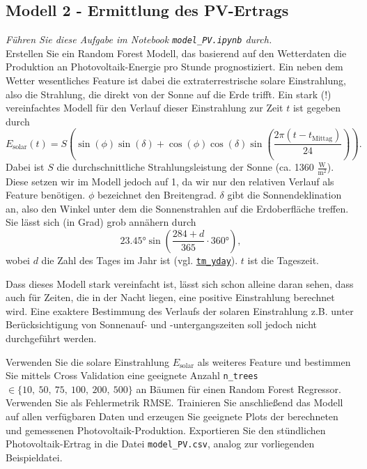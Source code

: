 \documentclass[11pt,a4paper]{article}
\begin{document}
\subsection*{Modell 2 - Ermittlung des PV-Ertrags}
\emph{Führen Sie diese Aufgabe im Notebook \texttt{model\_PV.ipynb} durch.}\\
Erstellen Sie ein Random Forest Modell, das basierend auf den Wetterdaten die Produktion an Photovoltaik-Energie pro Stunde prognostiziert. Ein neben dem Wetter wesentliches Feature ist dabei die extraterrestrische solare Einstrahlung, also die Strahlung, die direkt von der Sonne auf die Erde trifft. Ein stark (!) vereinfachtes Modell für den Verlauf dieser Einstrahlung zur Zeit $t$ ist gegeben durch 
$$ E_{\text{solar}}(t) = S \left( \sin(\phi)  \sin(\delta) + \cos(\phi) \cos(\delta)  \sin\left(\frac{2\pi(t - t_{\text{Mittag}})}{24}\right) \right).$$
Dabei ist $S$ die durchschnittliche Strahlungsleistung der Sonne (ca. 1360 $\frac{\text{W}}{\text{m}^2}$). Diese setzen wir im Modell jedoch auf 1, da wir nur den relativen Verlauf als Feature benötigen. $\phi$ bezeichnet den Breitengrad. $\delta$ gibt die Sonnendeklination an, also den Winkel unter dem die Sonnenstrahlen auf die Erdoberfläche treffen. Sie lässt sich (in Grad) grob annähern durch
$$ 23.45°  \sin\left(\frac{284 + d}{365} \cdot 360°  \right),$$
wobei $d$ die Zahl des Tages im Jahr ist (vgl. \href{https://docs.python.org/3/library/time.html#time.struct_time}{\texttt{tm\_yday}}).
$t$ ist die Tageszeit.

Dass dieses Modell stark vereinfacht ist, lässt sich schon alleine daran sehen, dass auch für Zeiten, die in der Nacht liegen, eine positive Einstrahlung berechnet wird. Eine exaktere Bestimmung des Verlaufs der solaren Einstrahlung z.B. unter Berücksichtigung von Sonnenauf- und -untergangszeiten soll jedoch nicht durchgeführt werden.

Verwenden Sie die solare Einstrahlung $E_\text{solar}$ als weiteres Feature und bestimmen Sie mittels Cross Validation eine geeignete Anzahl \texttt{n\_trees} $\in\lbrace 10,\ 50,\ 75,\ 100,\ 200,\ 500\rbrace$ an Bäumen für einen Random Forest Regressor. Verwenden Sie als Fehlermetrik RMSE. Trainieren Sie anschließend das Modell auf allen verfügbaren Daten und erzeugen Sie geeignete Plots der berechneten und gemessenen Photovoltaik-Produktion.  Exportieren Sie den stündlichen Photovoltaik-Ertrag in die Datei \texttt{model\_PV.csv}, analog zur vorliegenden Beispieldatei.
\end{document}
